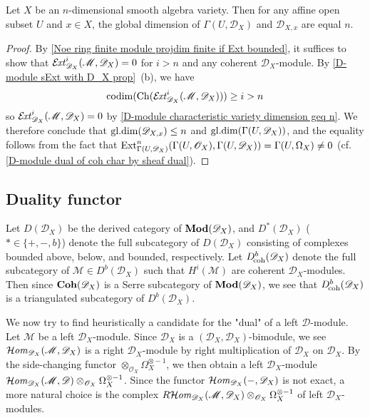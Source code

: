 \begin{theorem}\label{D-module global dimension of stalk n}
Let $X$ be an $n$-dimensional smooth algebra variety. Then for any affine open subset $U$ and $x\in X$, the global dimension of $\Gamma(U,\mathscr{D}_X)$ and $\mathscr{D}_{X,x}$ are equal $n$.
\end{theorem}
\begin{proof}
By \cref{Noe ring finite module projdim finite if Ext bounded}, it suffices to show that $\operatorname{\mathcal{E}\hspace*{-1.3pt}\textit{xt}\hspace{0.5pt}}_{\mathscr{D}_X}^i(\mathscr{M},\mathscr{D}_X)=0$ for $i>n$ and any coherent $\mathscr{D}_X$-module. By \cref{D-module sExt with D_X prop}~(b), we have
\[\mathrm{codim}(\mathrm{Ch}(\operatorname{\mathcal{E}\hspace*{-1.3pt}\textit{xt}\hspace{0.5pt}}_{\mathscr{D}_X}^i(\mathscr{M},\mathscr{D}_X)))\geq i>n\]
so $\operatorname{\mathcal{E}\hspace*{-1.3pt}\textit{xt}\hspace{0.5pt}}_{\mathscr{D}_X}^i(\mathscr{M},\mathscr{D}_X)=0$ by \cref{D-module characteristic variety dimension geq n}. We therefore conclude that $\mathrm{gl.dim}(\mathscr{D}_{X,x})\leq n$ and $\mathrm{gl.dim}(\Gamma(U,\mathscr{D}_X))$, and the equality follows from the fact that $\mathrm{Ext}_{\Gamma(U,\mathscr{D}_X)}^n(\Gamma(U,\mathscr{O}_{X}),\Gamma(U,\mathscr{D}_{X}))=\Gamma(U,\Omega_X)\neq 0$ (cf. \cref{D-module dual of coh char by sheaf dual}).
\end{proof}

\subsection{Duality functor}
Let $D(\mathscr{D}_X)$ be the derived category of $\mathbf{Mod}(\mathscr{D}_X)$, and $D^*(\mathscr{D}_X)$ ($*\in\{+,-,b\}$) denote the full subcategory of $D(\mathscr{D}_X)$ consisting of complexes bounded above, below, and bounded, respectively. Let $D^b_{\!\mathrm{coh}}(\mathscr{D}_X)$ denote the full subcategory of $\mathscr{M}\in D^b(\mathscr{D}_X)$ such that $H^i(\mathscr{M})$ are coherent $\mathscr{D}_X$-modules. Then since $\mathbf{Coh}(\mathscr{D}_X)$ is a Serre subcategory of $\mathbf{Mod}(\mathscr{D}_X)$, we see that $D^b_{\!\mathrm{coh}}(\mathscr{D}_X)$ is a triangulated subcategory of $D^b(\mathscr{D}_X)$.\par
We now try to find heuristically a candidate for the "dual" of a left $\mathscr{D}$-module. Let $\mathscr{M}$ be a left $\mathscr{D}_X$-module. Since $\mathscr{D}_X$ is a $(\mathscr{D}_X,\mathscr{D}_X)$-bimodule, we see $\operatorname{\mathcal{H}\hspace*{-0.4pt}\textit{om}\hspace{0.5pt}}_{\mathscr{D}_X}(\mathscr{M},\mathscr{D}_X)$ is a right $\mathscr{D}_X$-module by right multiplication of $\mathscr{D}_X$ on $\mathscr{D}_X$. By the side-changing functor $\otimes_{\mathscr{O}_X}\Omega_X^{\otimes -1}$, we then obtain a left $\mathscr{D}_X$-module $\operatorname{\mathcal{H}\hspace*{-0.4pt}\textit{om}\hspace{0.5pt}}_{\mathscr{D}_X}(\mathscr{M},\mathscr{D})\otimes_{\mathscr{O}_X}\Omega_X^{\otimes-1}$. Since the functor $\operatorname{\mathcal{H}\hspace*{-0.4pt}\textit{om}\hspace{0.5pt}}_{\mathscr{D}_X}(-,\mathscr{D}_X)$ is not exact, a more natural choice is the complex $R\!\operatorname{\mathcal{H}\hspace*{-0.4pt}\textit{om}\hspace{0.5pt}}_{\mathscr{D}_X}(\mathscr{M},\mathscr{D}_X)\otimes_{\mathscr{O}_X}\Omega_X^{\otimes-1}$ of left $\mathscr{D}_X$-modules.

